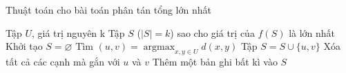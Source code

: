 \documentclass[12pt]{report}
\DeclarePairedDelimiter\floor{\lfloor}{\rfloor}
\DeclareMathOperator*{\argmax}{argmax}
\begin{document}
\begin{algorithm}
    \caption{Thuật toán cho bài toán phân tán tổng lớn nhất}
    \label{alg:1}
    \begin{algorithmic}
        \INPUT Tập $U$, giá trị nguyên k 
        \OUTPUT Tập $S$ ($|S|=k$) sao cho giá trị của $f(S)$ là lớn nhất
        \State Khởi tạo $S = \varnothing$
            \State Tìm $(u, v) = \argmax_{x, y \in U} d(x, y)$
            \State Tập $S = S \cup \{u, v\}$
            \State Xóa tất cả các cạnh mà gắn với $u$ và $v$ 
        \EndFor
            \State Thêm một bản ghi bất kì vào $S$ 
        \EndIf
    \end{algorithmic}
\end{algorithm}

{}

\end{document}
